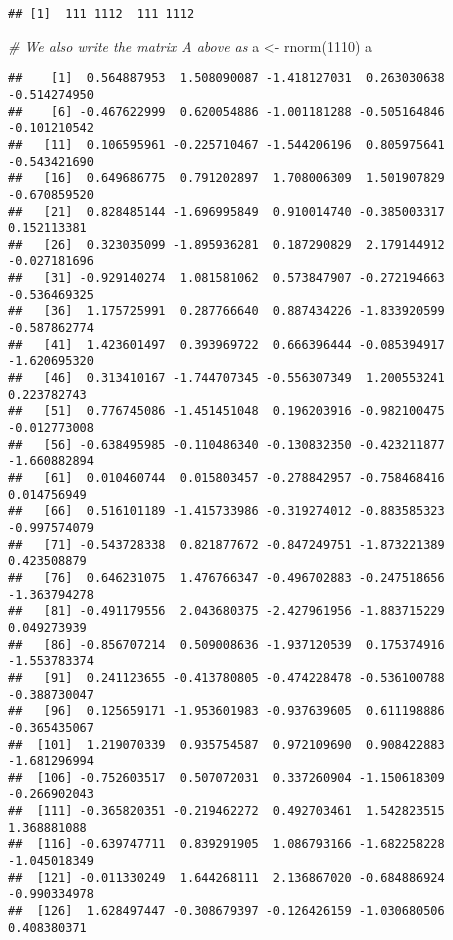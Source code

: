 \documentclass[
]{article}
\newenvironment{Shaded}{\begin{snugshade}}{\end{snugshade}}
\newcommand{\CommentTok}[1]{\textcolor[rgb]{0.56,0.35,0.01}{\textit{#1}}}
\newcommand{\DecValTok}[1]{\textcolor[rgb]{0.00,0.00,0.81}{#1}}
\newcommand{\FunctionTok}[1]{\textcolor[rgb]{0.00,0.00,0.00}{#1}}
\newcommand{\NormalTok}[1]{#1}
\newcommand{\OtherTok}[1]{\textcolor[rgb]{0.56,0.35,0.01}{#1}}
\begin{document}
\begin{verbatim}
## [1]  111 1112  111 1112
\end{verbatim}

\begin{Shaded}
\begin{Highlighting}[]
\CommentTok{\# We also write the matrix A above as}
\NormalTok{a }\OtherTok{\textless{}{-}} \FunctionTok{rnorm}\NormalTok{(}\DecValTok{1110}\NormalTok{)}
\NormalTok{a}
\end{Highlighting}
\end{Shaded}

\begin{verbatim}
##    [1]  0.564887953  1.508090087 -1.418127031  0.263030638 -0.514274950
##    [6] -0.467622999  0.620054886 -1.001181288 -0.505164846 -0.101210542
##   [11]  0.106595961 -0.225710467 -1.544206196  0.805975641 -0.543421690
##   [16]  0.649686775  0.791202897  1.708006309  1.501907829 -0.670859520
##   [21]  0.828485144 -1.696995849  0.910014740 -0.385003317  0.152113381
##   [26]  0.323035099 -1.895936281  0.187290829  2.179144912 -0.027181696
##   [31] -0.929140274  1.081581062  0.573847907 -0.272194663 -0.536469325
##   [36]  1.175725991  0.287766640  0.887434226 -1.833920599 -0.587862774
##   [41]  1.423601497  0.393969722  0.666396444 -0.085394917 -1.620695320
##   [46]  0.313410167 -1.744707345 -0.556307349  1.200553241  0.223782743
##   [51]  0.776745086 -1.451451048  0.196203916 -0.982100475 -0.012773008
##   [56] -0.638495985 -0.110486340 -0.130832350 -0.423211877 -1.660882894
##   [61]  0.010460744  0.015803457 -0.278842957 -0.758468416  0.014756949
##   [66]  0.516101189 -1.415733986 -0.319274012 -0.883585323 -0.997574079
##   [71] -0.543728338  0.821877672 -0.847249751 -1.873221389  0.423508879
##   [76]  0.646231075  1.476766347 -0.496702883 -0.247518656 -1.363794278
##   [81] -0.491179556  2.043680375 -2.427961956 -1.883715229  0.049273939
##   [86] -0.856707214  0.509008636 -1.937120539  0.175374916 -1.553783374
##   [91]  0.241123655 -0.413780805 -0.474228478 -0.536100788 -0.388730047
##   [96]  0.125659171 -1.953601983 -0.937639605  0.611198886 -0.365435067
##  [101]  1.219070339  0.935754587  0.972109690  0.908422883 -1.681296994
##  [106] -0.752603517  0.507072031  0.337260904 -1.150618309 -0.266902043
##  [111] -0.365820351 -0.219462272  0.492703461  1.542823515  1.368881088
##  [116] -0.639747711  0.839291905  1.086793166 -1.682258228 -1.045018349
##  [121] -0.011330249  1.644268111  2.136867020 -0.684886924 -0.990334978
##  [126]  1.628497447 -0.308679397 -0.126426159 -1.030680506  0.408380371

\end{verbatim}
\end{document}
